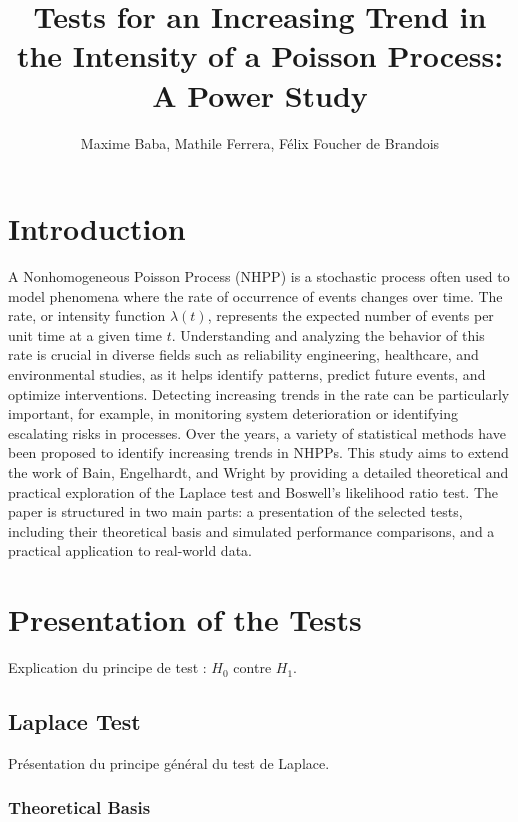 \documentclass{journalstyle}
\title{Tests for an Increasing Trend in the Intensity of a Poisson Process: A Power Study}
\author{Maxime Baba, Mathile Ferrera, Félix Foucher de Brandois}
\begin{document}
\maketitle




\section{Introduction}

A Nonhomogeneous Poisson Process (NHPP) is a stochastic process often used to model phenomena where the rate of occurrence of events changes over time.
The rate, or intensity function $\lambda(t)$, represents the expected number of events per unit time at a given time $t$.
Understanding and analyzing the behavior of this rate is crucial in diverse fields such as reliability engineering, healthcare, and environmental studies, as it helps identify patterns, predict future events, and optimize interventions.
Detecting increasing trends in the rate can be particularly important, for example, in monitoring system deterioration or identifying escalating risks in processes.
Over the years, a variety of statistical methods have been proposed to identify increasing trends in NHPPs.
This study aims to extend the work of Bain, Engelhardt, and Wright \cite{BainEngelhardtWright} by providing a detailed theoretical and practical exploration of the Laplace test and Boswell’s likelihood ratio test.
The paper is structured in two main parts: a presentation of the selected tests, including their theoretical basis and simulated performance comparisons, and a practical application to real-world data.


\section{Presentation of the Tests}

Explication du principe de test : $H_0$ contre $H_1$.

\subsection{Laplace Test}

Présentation du principe général du test de Laplace.

\subsubsection{Theoretical Basis}
\end{document}
